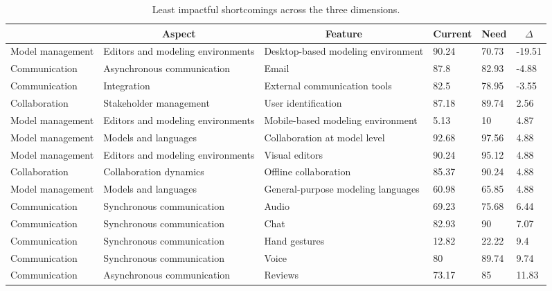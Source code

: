 
  \begin{table*}[]
  \centering
  \notsotiny
  \caption{ Least impactful shortcomings across the three dimensions.}
\label{tab:least-impactful}
\begin{tabular}{|l|l|l|l|l|l|}
  \hline
  \rowcolor[HTML]{C0C0C0}
    \multicolumn{1}{|c|}{Dimension} & \multicolumn{1}{c|}{Aspect} & \multicolumn{1}{c|}{Feature} & \multicolumn{1}{c|}{Current} & \multicolumn{1}{c|}{Need} & \multicolumn{1}{c|}{$\Delta$} \\ \hline
    Model management & Editors and modeling environments & Desktop-based modeling environment & 90.24 & 70.73 & -19.51 \\ \hline 
Communication & Asynchronous communication & Email & 87.8 & 82.93 & -4.88 \\ \hline 
Communication & Integration & External communication tools & 82.5 & 78.95 & -3.55 \\ \hline 
Collaboration & Stakeholder management & User identification & 87.18 & 89.74 & 2.56 \\ \hline 
Model management & Editors and modeling environments & Mobile-based modeling environment & 5.13 & 10 & 4.87 \\ \hline 
Model management & Models and languages & Collaboration at model level & 92.68 & 97.56 & 4.88 \\ \hline 
Model management & Editors and modeling environments & Visual editors & 90.24 & 95.12 & 4.88 \\ \hline 
Collaboration & Collaboration dynamics & Offline collaboration & 85.37 & 90.24 & 4.88 \\ \hline 
Model management & Models and languages & General-purpose modeling languages & 60.98 & 65.85 & 4.88 \\ \hline 
Communication & Synchronous communication & Audio & 69.23 & 75.68 & 6.44 \\ \hline 
Communication & Synchronous communication & Chat & 82.93 & 90 & 7.07 \\ \hline 
Communication & Synchronous communication & Hand gestures & 12.82 & 22.22 & 9.4 \\ \hline 
Communication & Synchronous communication & Voice & 80 & 89.74 & 9.74 \\ \hline 
Communication & Asynchronous communication & Reviews & 73.17 & 85 & 11.83 \\ \hline 

\end{tabular}
\end{table*}
